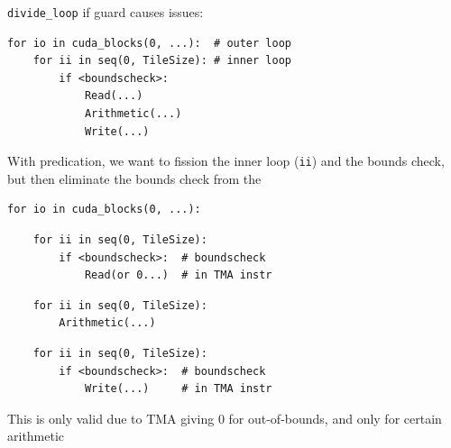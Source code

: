 \newpage
{}

\begin{minipage}[t]{0.48\textwidth}\fixminipage
{}

\texttt{divide\_loop} if guard causes issues:

\begin{verbatim}
for io in cuda_blocks(0, ...):  # outer loop
    for ii in seq(0, TileSize): # inner loop
        if <boundscheck>:
            Read(...)
            Arithmetic(...)
            Write(...)
\end{verbatim}

With  predication, we want to fission the inner loop (\texttt{ii}) and the bounds check, but then eliminate the bounds check from the 

\begin{verbatim}
for io in cuda_blocks(0, ...):
\end{verbatim}
\begin{mdframed}[style=MyFrame, backgroundcolor=greenBoxBg]
\begin{verbatim}
    for ii in seq(0, TileSize):
        if <boundscheck>:  # boundscheck
            Read(or 0...)  # in TMA instr
\end{verbatim}
\end{mdframed}
\begin{mdframed}[style=MyFrame, backgroundcolor=redBoxBg]
\color{redBoxFg}
\begin{verbatim}
    for ii in seq(0, TileSize):
        Arithmetic(...)
\end{verbatim}
\end{mdframed}
\begin{mdframed}[style=MyFrame, backgroundcolor=greenBoxBg]
\color{greenBoxFg}
\begin{verbatim}
    for ii in seq(0, TileSize):
        if <boundscheck>:  # boundscheck
            Write(...)     # in TMA instr
\end{verbatim}
\end{mdframed}

This is only valid due to TMA giving 0 for out-of-bounds, and only for certain arithmetic

\end{minipage}
\hfill

